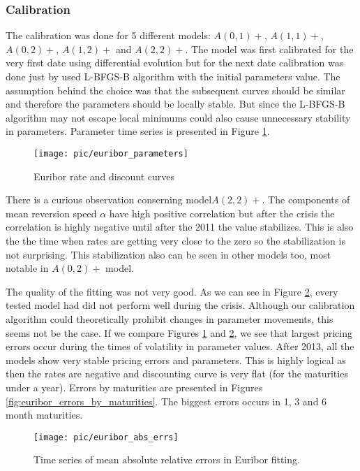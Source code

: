 \subsubsection{Calibration}

The calibration was done for 5 different models: $A(0,1)+$, $A(1,1)+$, $A(0,2)+$, $A(1,2)+$ and $A(2,2)+$. The model was first calibrated for the very first date using differential evolution but for the next date calibration was done just by used L-BFGS-B algorithm with the initial parameters value. The assumption behind the choice was that the subsequent curves should be similar and therefore the parameters should be locally stable. But since the L-BFGS-B algorithm may not escape local minimums could also cause unnecessary stability in parameters. Parameter time series is presented in Figure \ref{fig:euribor_parameters}. 

\begin{figure}[H]
	\centering
	\texttt{[image: pic/euribor\_parameters]}
	\caption{Euribor rate and discount curves}
	\label{fig:euribor_parameters}
\end{figure}

There is a curious observation conserning model$A(2,2)+$. The components of mean reversion speed $\alpha$ have high positive correlation but after the crisis the correlation is highly negative until after the 2011 the value stabilizes. This is also the the time when rates are getting very close to the zero so the stabilization is not surprising. This stabilization  also can be seen in other models too, most notable in $A(0,2)+$ model.

The quality of the fitting was not very good. As we can see in Figure \ref{fig:euribor_abs_errs}, every tested model had did not perform well during the crisis. Although our calibration algorithm could theoretically prohibit changes in parameter movements, this seems not be the case. If we compare Figures \ref{fig:euribor_parameters} and \ref{fig:euribor_abs_errs}, we see that largest pricing errors occur during the times of volatility in parameter values. After 2013, all the models show very stable pricing errors and parameters. This is highly logical as then the rates are negative and discounting curve is very flat (for the maturities under a year). Errors by maturities are presented in Figures \ref{fig:euribor_errors_by_maturities}. The biggest errors occurs in 1, 3 and 6 month maturities.

\begin{figure}[H]
	\centering
	\texttt{[image: pic/euribor\_abs\_errs]}
	\caption{Time series of mean absolute relative errors in Euribor fitting.}
	\label{fig:euribor_abs_errs}
\end{figure}

